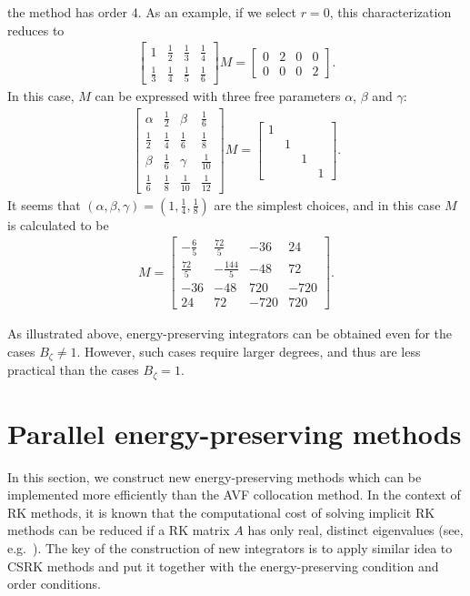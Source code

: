 \documentclass[final,leqno,onefignum,onetabnum]{siamltex1213}
\begin{document}
the method has order 4.
As an example, if we select $r=0$, this characterization reduces to
\begin{align}
\begin{bmatrix}
1 & \frac{1}{2} & \frac{1}{3} & \frac{1}{4} \\
\frac{1}{3} & \frac{1}{4} & \frac{1}{5} & \frac{1}{6}
\end{bmatrix}
M = 
\begin{bmatrix}
0 & 2 & 0 & 0 \\
0 & 0 & 0 & 2
\end{bmatrix}.
\end{align}
In this case, $M$ can be expressed with three free parameters 
$\alpha$, $\beta$ and $\gamma$:
\begin{align}
\begin{bmatrix}
\alpha & \frac{1}{2} & \beta & \frac{1}{6}\\
\frac{1}{2}& \frac{1}{4} & \frac{1}{6} & \frac{1}{8} \\
\beta & \frac{1}{6} & \gamma & \frac{1}{10} \\
\frac{1}{6} & \frac{1}{8} & \frac{1}{10} & \frac{1}{12}
\end{bmatrix}
M = 
\begin{bmatrix}
1 & & & \\
& 1 & & \\
& & 1 & \\
& & & 1
\end{bmatrix}.
\end{align}
It seems that $(\alpha, \beta , \gamma) = (1,\frac{1}{4}, \frac{1}{8})$
are the simplest choices, and in this case $M$ is calculated to be
\begin{align}
M=
\begin{bmatrix}
-\frac{6}{5} & \frac{72}{5} & -36 & 24\\
\frac{72}{5} & -\frac{144}{5} & -48 & 72 \\
-36 & -48 & 720 & -720 \\
24 & 72 & -720 & 720 
\end{bmatrix}.
\end{align}

As illustrated above, energy-preserving integrators can be obtained 
even for the cases $B_\zeta\neq 1$.
However, such cases require larger degrees,
and thus are less practical than the cases $B_\zeta=1$.

\section{Parallel energy-preserving methods}
\label{sec5}
In this section, we construct new energy-preserving methods
which can be implemented more efficiently than
the AVF collocation method.
In the context of RK methods,
it is known that
the computational cost of solving implicit RK methods
can be reduced if a RK matrix $A$ has only real, distinct eigenvalues
(see, e.g.~\cite{bu13,hw96ii}).
The key of the construction of new integrators
is to apply similar idea to CSRK methods
and put it together with the energy-preserving condition and order conditions.
\end{document}
